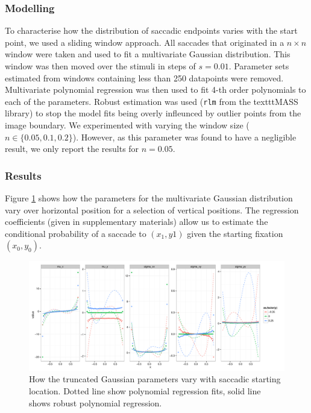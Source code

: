 \subsubsection{Modelling}


To characterise how the distribution of saccadic endpoints varies with the start point, we used a sliding window approach. All saccades that originated in a $n\times n$ window were taken and used to fit a multivariate Gaussian distribution. This window was then moved over the stimuli in steps of $s=0.01$. Parameter sets estimated from windows containing less than 250 datapoints were removed. Multivariate polynomial regression was then used to fit 4-th order polynomials to each of the parameters. Robust estimation was used (\texttt{rlm} from the texttt{MASS} library) to stop the model fits being overly infleunced by outlier points from the image boundary. We experimented with varying the window size ($n\in\{0.05,0.1, 0.2\}$). However, as this parameter was found to have a negligible result, we only report the results for $n=0.05$.

\subsubsection{Results}

Figure \ref{fig:nParamsOverSpace} shows how the parameters for the multivariate Gaussian distribution vary over horizontal position for a selection of vertical positions. The regression coefficients (given in supplementary materials) allow us to estimate the conditional probability of a saccade to $(x_1, y1)$ given the starting fixation $(x_0, y_0)$.

\begin{figure}
\centering
\includegraphics[width=14cm]{../scripts/flow/figs/NparamsChagingOverSpaceALLtN}
\caption{How the truncated Gaussian parameters vary with saccadic starting location. Dotted line show polynomial regression fits, solid line shows robust polynomial regression.}
\label{fig:nParamsOverSpace}
\end{figure}


